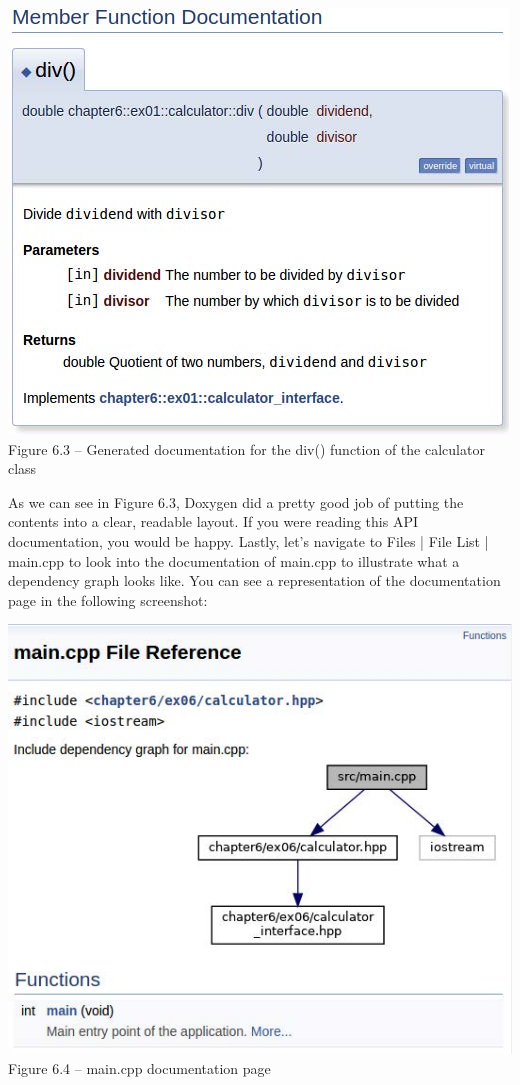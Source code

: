 \begin{center}
\includegraphics[width=1.\textwidth]{content/2/chapter6/images/3.jpg}\\
Figure 6.3 – Generated documentation for the div() function of the calculator class
\end{center}

As we can see in Figure 6.3, Doxygen did a pretty good job of putting the contents into a clear, readable layout. If you were reading this API documentation, you would be happy. Lastly, let's navigate to Files | File List | main.cpp to look into the documentation of main.cpp to illustrate what a dependency graph looks like. You can see a representation of the documentation page in the following screenshot:

\begin{center}
\includegraphics[width=1.\textwidth]{content/2/chapter6/images/4.jpg}\\
Figure 6.4 – main.cpp documentation page
\end{center}

